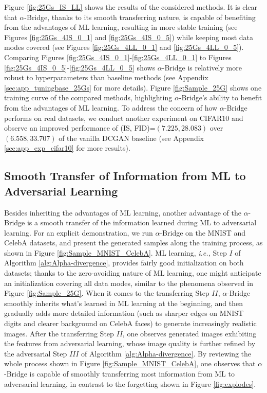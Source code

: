 \documentclass[letterpaper]{article} %
\newcommand{\ie}[0]{\emph{i.e., }}
\begin{document}
Figure \ref{fig:25Gs_IS_LL} shows the results of the considered methods.
It is clear that $\alpha$-Bridge, thanks to its smooth transferring nature, is capable of benefiting from the advantages of ML learning, resulting in more stable training (see Figures \ref{fig:25Gs_4IS_0_1} and \ref{fig:25Gs_4IS_0_5}) while keeping most data modes covered (see Figures \ref{fig:25Gs_4LL_0_1} and \ref{fig:25Gs_4LL_0_5}).
Comparing Figures \ref{fig:25Gs_4IS_0_1}-\ref{fig:25Gs_4LL_0_1} to Figures \ref{fig:25Gs_4IS_0_5}-\ref{fig:25Gs_4LL_0_5} shows $\alpha$-Bridge is relatively more robust to hyperparameters than baseline methods (see
Appendix \ref{sec:app_tuningbase_25Gs}
for more details).
Figure \ref{fig:Sample_25G} shows one training curve of the compared methods, highlighting $\alpha$-Bridge's ability to benefit from the advantages of ML learning.
To address the concern of how $\alpha$-Bridge performs on real datasets, we conduct another experiment on CIFAR$10$ \cite{krizhevsky2009learning}
and observe an improved performance of (IS, FID\cite{heusel2017gans})=$(7.225, 28.083)$ over $(6.558, 33.707)$ of the vanilla DCGAN baseline (see
Appendix \ref{sec:app_exp_cifar10}
for more results).


\subsection{Smooth Transfer of Information from ML to Adversarial Learning}

Besides inheriting the advantages of ML learning, another advantage of the $\alpha$-Bridge is a smooth transfer of the information learned during ML to adversarial learning.
For an explicit demonstration, we run $\alpha$-Bridge on the MNIST \cite{lecun1998gradient} and CelebA \cite{liu2015deep} datasets, and present the generated samples along the training process, as shown in Figure \ref{fig:Sample_MNIST_CelebA}.
ML learning, \ie Step $I$ of Algorithm \ref{alg:Alpha-divergence}, provides fairly good initialization on both datasets; thanks to the zero-avoiding nature of ML learning, one might anticipate an initialization covering all data modes, similar to the phenomena observed in Figure \ref{fig:Sample_25G}.
When it comes to the transferring Step $I\!I$, $\alpha$-Bridge smoothly inherits what's learned in ML learning at the beginning, and then gradually adds more detailed information (such as sharper edges on MNIST digits and clearer background on CelebA faces) to generate increasingly realistic images.
After the transferring Step $I\!I$, one observes generated images exhibiting the features from adversarial learning, whose image quality is further refined by the adversarial Step $I\!I\!I$ of Algorithm \ref{alg:Alpha-divergence}.
By reviewing the whole process shown in Figure \ref{fig:Sample_MNIST_CelebA}, one observes that $\alpha$-Bridge is capable of smoothly transferring most information from ML to adversarial learning, in contrast to the forgetting shown in Figure \ref{fig:explodes}.
\end{document}
